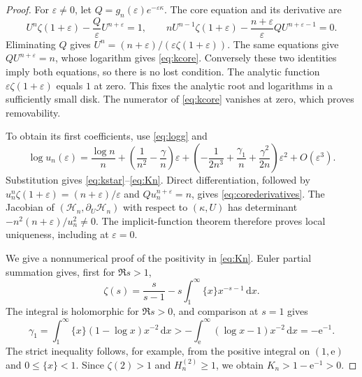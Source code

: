 \documentclass[11pt,a4paper]{article}
\numberwithin{equation}{section}
\theoremstyle{definition}\newtheorem{definition}[theorem]{Definition}
\theoremstyle{remark}\newtheorem{remark}[theorem]{Remark}
\newcommand{\dd}{\,\mathrm d}\newcommand{\eps}{\varepsilon}
\newcommand{\HH}{\mathcal H}
\begin{document}
\begin{proof}
For $\eps\ne0$, let $Q=g_n(\eps)e^{-\eps\kappa}$. The core equation
and its derivative are
\[
 U^n\zeta(1+\eps)-\frac{Q}{\eps}U^{n+\eps}=1,\qquad
 nU^{n-1}\zeta(1+\eps)-\frac{n+\eps}{\eps}QU^{n+\eps-1}=0.
\]
Eliminating $Q$ gives $U^n=(n+\eps)/(\eps\zeta(1+\eps))$.
The same equations give $QU^{n+\eps}=n$, whose logarithm gives
\eqref{eq:kcore}. Conversely these two identities imply both equations,
so there is no lost condition. The analytic function
$\eps\zeta(1+\eps)$ equals $1$ at zero. This fixes the analytic root
and logarithms in a sufficiently small disk. The numerator of
\eqref{eq:kcore} vanishes at zero, which proves removability.

To obtain its first coefficients, use \eqref{eq:logg} and
\[
 \log u_n(\eps)=\frac{\log n}{n}
 +\left(\frac1{n^2}-\frac\gamma n\right)\eps
 +\left(-\frac1{2n^3}+\frac{\gamma_1}{n}
                            +\frac{\gamma^2}{2n}\right)\eps^2
 +O(\eps^3).
\]
Substitution gives \eqref{eq:kstar}--\eqref{eq:Kn}.
Direct differentiation, followed by
$u_n^n\zeta(1+\eps)=(n+\eps)/\eps$ and $Qu_n^{n+\eps}=n$,
gives \eqref{eq:corederivatives}. The Jacobian of
$(\HH_n,\partial_U\HH_n)$ with respect to $(\kappa,U)$ has determinant
$-n^2(n+\eps)/u_n^2\ne0$. The implicit-function theorem therefore proves
local uniqueness, including at $\eps=0$.

We give a nonnumerical proof of the positivity in \eqref{eq:Kn}.
Euler partial summation gives, first for $\Re s>1$,
\[
 \zeta(s)=\frac{s}{s-1}-s\int_1^\infty\{x\}x^{-s-1}\dd x.
\]
The integral is holomorphic for $\Re s>0$, and comparison at $s=1$ gives
\[
 \gamma_1=\int_1^\infty \{x\}(1-\log x)x^{-2}\dd x
 >-\int_{\mathrm e}^\infty(\log x-1)x^{-2}\dd x=-\mathrm e^{-1}.
\]
The strict inequality follows, for example, from the positive integral
on $(1,\mathrm e)$ and $0\le\{x\}<1$. Since $\zeta(2)>1$ and
$H_n^{(2)}\ge1$, we obtain $K_n>1-\mathrm e^{-1}>0$.
\end{proof}
\end{document}
